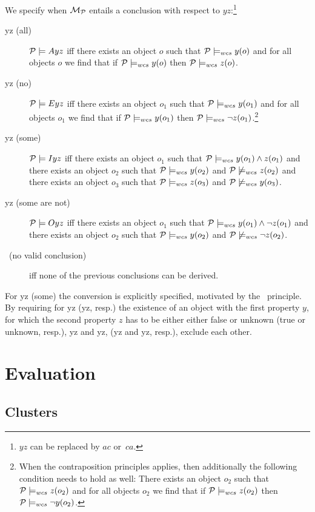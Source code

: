 \documentclass[12pt]{article}
\begin{document}
We specify when ${\cal M}_{\cal P}$ entails a conclusion with respect to $yz$:\footnote{$yz$ can be replaced by $ac$ or~$ca$.}
\begin{description}
\item[\MA yz (all)] ${\cal P} \models Ayz$ iff there exists an object $o$ such that ${\cal P} \models_{wcs}
y(o)$ and for all objects $o$ we find that if ${\cal P} \models_{wcs} y(o)$ then ${\cal P} \models_{wcs} z(o)$.
\item [\ME yz (no)]
${\cal P} \models Eyz$ iff there exists an object $o_1$ such that ${\cal P} \models_{wcs}
y(o_1)$ and for all objects $o_1$ we find that if ${\cal P} \models_{wcs} y(o_1)$ then
${\cal P} \models_{wcs} \neg z(o_1)$.\footnote{
When the contraposition principles applies, then additionally 
the following condition needs to hold as well: There exists an object $o_2$ such that ${\cal P} \models_{wcs}
z(o_2)$ and for all objects $o_2$ we find that if ${\cal P} \models_{wcs} z(o_2)$ then
${\cal P} \models_{wcs} \neg y(o_2)$.}
\item[\MI yz (some)]
${\cal P} \models Iyz$ iff there exists an object $o_1$ such that ${\cal P} \models_{wcs}
y(o_1) \wedge z(o_1)$ and there exists an
object $o_2$ such that ${\cal P} \models_{wcs} y(o_2)$ and
${\cal P} \not\models_{wcs} z(o_2)$ and
there exists an
object $o_3$ such that ${\cal P} \models_{wcs} z(o_3)$ and
${\cal P} \not\models_{wcs} y(o_3)$.
\item[\MO yz (some are not)]
${\cal P} \models Oyz$ iff there exists an object $o_1$ such that ${\cal P} \models_{wcs}
y(o_1) \wedge \neg z(o_1)$ and there exists an
object $o_2$ such that ${\cal P} \models_{wcs} y(o_2)$ and
${\cal P} \not\models_{wcs} \neg z(o_2)$.
\item[\NVC\ (no valid conclusion)] iff none of the previous conclusions can be derived.
\end{description}
For \MI yz (some) the conversion is explicitly specified, motivated by the \converse\ principle.
By requiring for \MI yz (\MO yz, resp.) the existence of an object with the first property $y$,
for which the second property $z$ has to be either either false or unknown (true or unknown, resp.),
\MA yz and \MI yz, (\ME yz and \MO yz, resp.), exclude each other.

\section{Evaluation} 

\subsection{Clusters}\label{sect:aggregateddata}
\end{document}
